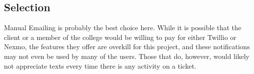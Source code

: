 \documentclass[onecolumn, draftclsnofoot,10pt, compsoc]{IEEEtran}
\begin{document}
\subsection{Selection}
Manual Emailing is probably the best choice here. While it is possible that the client or a member of the college would be willing to pay for either Twillio or Nexmo, the features they offer are overkill
for this project, and these notifications may not even be used by many of the users. Those that do, however, would likely not appreciate texts every time there is any activity on a ticket.






\end{document}
